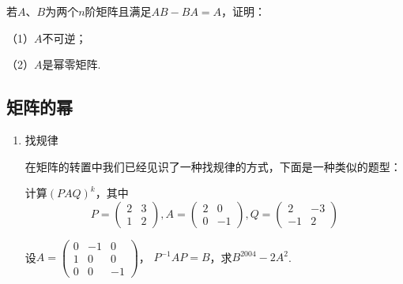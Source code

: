 \begin{example}
	若$A$、$B$为两个$n$阶矩阵且满足$AB-BA=A$，证明：

	\textup{（1）}$A$不可逆；

	\textup{（2）}$A$是幂零矩阵.
\end{example}

\subsection{矩阵的幂}
\begin{enumerate}
	\item 找规律
	
	在矩阵的转置中我们已经见识了一种找规律的方式，下面是一种类似的题型：
	\begin{example}
		计算$(PAQ)^k$，其中
		$$P=\begin{pmatrix}2 & 3 \\ 1 & 2\end{pmatrix}, A=\begin{pmatrix}2 & 0 \\ 0 & -1\end{pmatrix}, Q=\begin{pmatrix}2 & -3 \\ -1 & 2\end{pmatrix}$$
	\end{example}
	
	\begin{example}
		设$A=\begin{pmatrix}0 & -1 & 0 \\ 1 & 0 & 0 \\ 0 & 0 & -1 \end{pmatrix}$，
		$P^{-1}AP=B$，求$B^{2004}-2A^2$.
	\end{example}


\end{enumerate}
